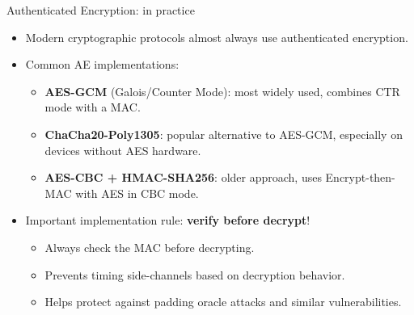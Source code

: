 \documentclass[aspectratio=169, lualatex, handout]{beamer}
\begin{document}
\begin{frame}{Authenticated Encryption: in practice}
	\begin{itemize}
		\item Modern cryptographic protocols almost always use authenticated encryption.
		\item Common AE implementations:
		      \begin{itemize}
			      \item \textbf{AES-GCM} (Galois/Counter Mode): most widely used, combines CTR mode with a MAC.
			      \item \textbf{ChaCha20-Poly1305}: popular alternative to AES-GCM, especially on devices without AES hardware.
			      \item \textbf{AES-CBC + HMAC-SHA256}: older approach, uses Encrypt-then-MAC with AES in CBC mode.
		      \end{itemize}
		\item Important implementation rule: \textbf{verify before decrypt}!
		      \begin{itemize}
			      \item Always check the MAC before decrypting.
			      \item Prevents timing side-channels based on decryption behavior.
			      \item Helps protect against padding oracle attacks and similar vulnerabilities.
		      \end{itemize}
	\end{itemize}
\end{frame}
\end{document}
